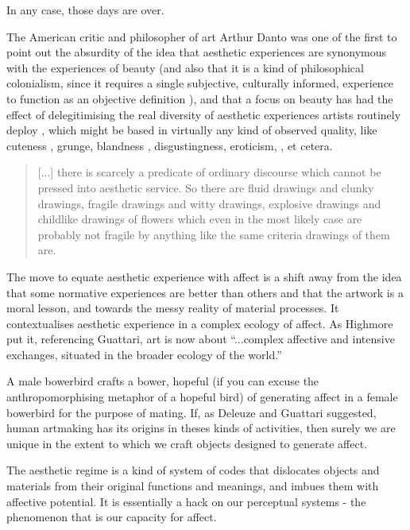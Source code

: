\documentclass[letterpaper]{article}
\begin{document}
        In any case, those days are over.

        The American critic and philosopher of art Arthur Danto was one of the first to point out the absurdity of the idea that aesthetic experiences are synonymous with the experiences of beauty (and also that it is a kind of philosophical colonialism, since it requires a single subjective, culturally informed, experience to function as an objective definition \citep[p.124]{DantoEmbdMnngs2007}), and that a focus on beauty has had the effect of delegitimising the real diversity of aesthetic experiences artists routinely deploy \citep[p.59]{DantoThAbsOfBty2003}, which might be based in virtually any kind of observed quality, like cuteness \citep[p.28]{DantoThPhlsphclArt2005}, grunge, blandness \citep[p.126]{DantoEmbdMnngs2007}, disgustingness, eroticism, \citep[p.59]{DantoThAbsOfBty2003}, et cetera.

        \begin{quote}
            [...] there is scarcely a predicate of ordinary discourse which cannot be pressed into aesthetic service. So there are fluid drawings and clunky drawings, fragile drawings and witty drawings, explosive drawings and childlike drawings of flowers which even in the most likely case are probably not fragile by anything like the same criteria drawings of them are. \citep[pp. 28-29]{DantoThPhlsphclArt2005}
        \end{quote}

        The move to equate aesthetic experience with affect is a shift away from the idea that some normative experiences are better than others and that the artwork is a moral lesson, and towards the messy reality of material processes. It contextualises aesthetic experience in a complex ecology of affect. As Highmore put it, referencing Guattari, art is now about “...complex affective and intensive exchanges, situated in the broader ecology of the world.” \citep[p.155]{HighmoreBttrAftrTst2010}

        A male bowerbird crafts a bower, hopeful (if you can excuse the anthropomorphising metaphor of a hopeful bird) of generating affect in a female bowerbird for the purpose of mating. If, as Deleuze and Guattari suggested, human artmaking has its origins in theses kinds of activities, then surely we are unique in the extent to which we craft objects designed to generate affect.
        
        The aesthetic regime is a kind of system of codes that dislocates objects and materials from their original functions and meanings, and imbues them with affective potential. It is essentially a hack on our perceptual systems - the phenomenon that is our capacity for affect.
\end{document}
